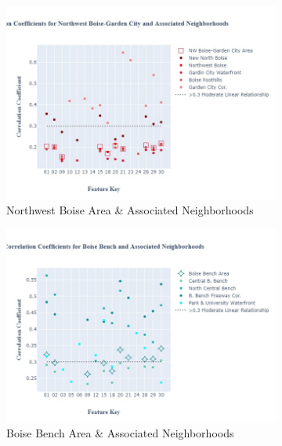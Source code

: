 \documentclass{article}
\begin{document}
\begin{figure}[H]
     \centering
     \begin{subfigure}[b]{0.45\textwidth}
         \centering
         \includegraphics[width=\textwidth]{NW_fig.jpg}
         \caption{Northwest Boise Area \& Associated Neighborhoods}
         \label{fig: nw_cc}
     \end{subfigure}
     \begin{subfigure}[b]{0.45\textwidth}
         \centering
         \includegraphics[width=\textwidth]{BB_fig.jpg}
         \caption{Boise Bench Area \& Associated Neighborhoods}
         \label{fig: bb_cc}
     \end{subfigure}
          \begin{subfigure}[b]{0.45\textwidth}
         \centering

\end{subfigure}
\end{figure}
\end{document}
